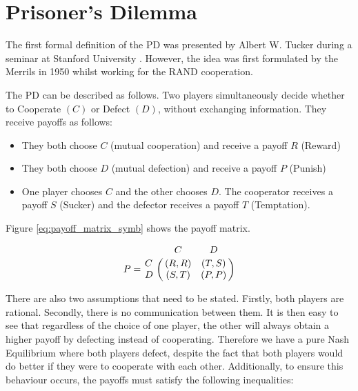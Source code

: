 \section{Prisoner's Dilemma}\label{sec:intro_pd}
The first formal definition of the PD was presented by Albert W. Tucker during a seminar at Stanford University \cite{Gass2005}.
However, the idea was first formulated by the Merrils \cite{Flood1958} in 1950 whilst working for the RAND cooperation.

The PD can be described as follows. Two players simultaneously decide whether to
Cooperate $(C)$ or Defect $(D)$, without exchanging information.  They receive
payoffs as follows:

\begin{itemize}
    \item They both choose $C$ (mutual cooperation) and receive a payoff $R$ (Reward)
    \item They both choose $D$ (mutual defection) and receive a payoff $P$ (Punish)
    \item One player chooses $C$ and the other chooses $D$. The cooperator receives a payoff $S$ (Sucker) and the defector receives a payoff $T$ (Temptation).
\end{itemize}

Figure \ref{eq:payoff_matrix_symb} shows the payoff matrix.

\begin{equation}\label{eq:payoff_matrix_symb}
%
P = \bordermatrix{~ & C & D \cr
                  C & (R, R) & (T, S) \cr
                  D & (S, T) & (P, P) \cr}
%
\end{equation}

There are also two assumptions that need to be stated.
Firstly, both players are rational.
Secondly, there is no communication between them.
It is then easy to see that regardless of the choice of one player, the other will always obtain a higher payoff by defecting instead of cooperating.
Therefore we have a pure Nash Equilibrium where both players defect, despite the fact that both players would do better if they were to cooperate with each other.
Additionally, to ensure this behaviour occurs, the payoffs must satisfy the following inequalities:

